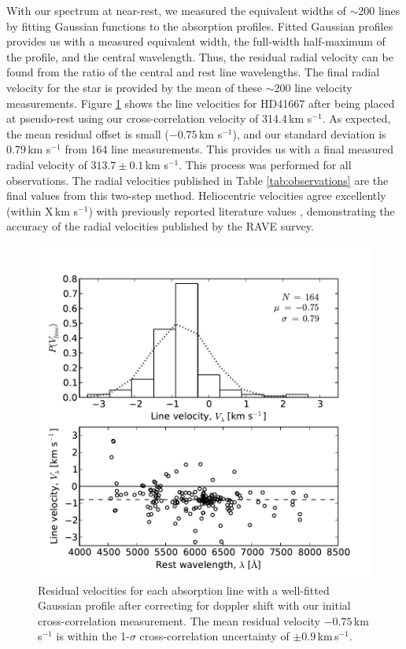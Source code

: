 \documentclass{emulateapj}
\begin{document}
With our spectrum at near-rest, we measured the equivalent widths of $\sim$200 lines by fitting Gaussian functions to the absorption profiles. Fitted Gaussian profiles provides us with a measured equivalent width, the full-width half-maximum of the profile, and the central wavelength. Thus, the residual radial velocity can be found from the ratio of the central and rest line wavelengths. The final radial velocity for the star is provided by the mean of these $\sim$200 line velocity measurements. Figure \ref{fig:line-velocities} shows the line velocities for HD41667 after being placed at pseudo-rest using our cross-correlation velocity of 314.4\,km s$^{-1}$. As expected, the mean residual offset is small ($-0.75$\,km s$^{-1}$), and our standard deviation is 0.79\,km s$^{-1}$ from 164 line measurements. This provides us with a final measured radial velocity of $313.7 \pm 0.1$\,km s$^{-1}$. This process was performed for all observations. The radial velocities published in Table \ref{tab:observations} are the final values from this two-step method. Heliocentric velocities agree excellently (within X\,km s$^{-1}$) with previously reported literature values \citep{williams;et-al_2011,wylie-de-boer;et-al_2012}, demonstrating the accuracy of the radial velocities published by the RAVE survey.

\begin{figure}[h]
	\includegraphics[width=\columnwidth]{./figures/line-velocity.pdf}
	\caption{Residual velocities for each absorption line with a well-fitted Gaussian profile after correcting for  doppler shift with our initial cross-correlation measurement. The mean residual velocity $-0.75$\,km\,s$^{-1}$ is within the 1-$\sigma$ cross-correlation uncertainty of $\pm0.9$\,km\,s$^{-1}$.}
	\label{fig:line-velocities}
\end{figure}
\end{document}
